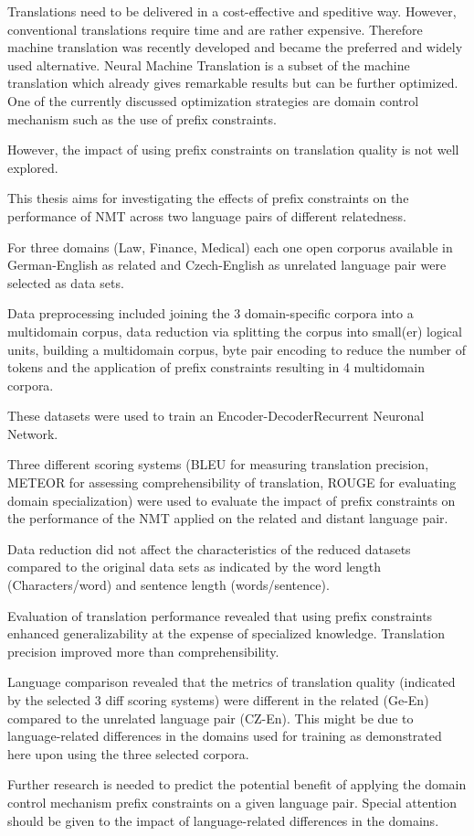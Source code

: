 Translations need to be delivered in a cost-effective and speditive way.
However, conventional translations require time and are rather expensive.
Therefore machine translation was recently developed and became the preferred and widely used alternative. 
Neural Machine Translation is a subset of the machine translation which already gives remarkable results but can be further optimized. One of the currently discussed optimization strategies are domain control mechanism such as the use of prefix constraints. 

However, the impact of using prefix constraints on translation quality is not well explored. 

This thesis aims for investigating the effects of prefix constraints on the performance of NMT across two language pairs of different relatedness. 

For three domains (Law, Finance, Medical) each one open corporus available in German-English as related and Czech-English as unrelated language pair were selected as data sets. 

Data preprocessing included joining the 3 domain-specific corpora into a multidomain corpus, data reduction via splitting the corpus into small(er) logical units, building a multidomain corpus, byte pair encoding to reduce the number of tokens and the application of prefix constraints resulting in 4 multidomain corpora. 

These datasets were used to train an Encoder-DecoderRecurrent Neuronal Network.

Three different scoring systems  (BLEU for measuring translation precision, METEOR for assessing comprehensibility of translation, ROUGE for evaluating domain specialization) were used to evaluate the impact of prefix constraints on the performance of the NMT applied on the related and distant language pair. 

Data reduction did not affect the characteristics of the reduced datasets compared to the original data sets as indicated by the word length (Characters/word) and sentence length (words/sentence).

Evaluation of translation performance revealed that using prefix constraints enhanced generalizability at the expense of specialized knowledge. Translation precision improved more than comprehensibility.

Language comparison revealed that the metrics of translation quality (indicated by the selected 3 diff scoring systems) were different in the related (Ge-En) compared to the unrelated language pair (CZ-En).
This might be due to  language-related differences in the domains used for training as demonstrated here upon using the three selected corpora. 

Further research is needed to predict the potential benefit of applying the domain control mechanism prefix constraints on a given language pair.
Special attention should be given to the impact of language-related differences in the domains.
